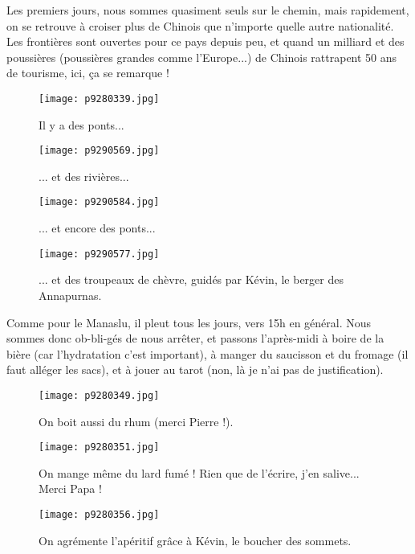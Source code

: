 \documentclass{book}
\begin{document}
Les premiers jours, nous sommes quasiment seuls sur le chemin, mais rapidement, on se retrouve à croiser plus de Chinois que n'importe quelle autre nationalité. Les frontières sont ouvertes pour ce pays depuis peu, et quand un milliard et des poussières (poussières grandes comme l'Europe...) de Chinois rattrapent 50 ans de tourisme, ici, ça se remarque !


\begin{figure}[h]
\centering
\texttt{[image: p9280339.jpg]}
\caption*{Il y a des ponts...}
\end{figure}


\begin{figure}[h]
\centering
\texttt{[image: p9290569.jpg]}
\caption*{... et des rivières...}
\end{figure}


\begin{figure}[h]
\centering
\texttt{[image: p9290584.jpg]}
\caption*{... et encore des ponts...}
\end{figure}


\begin{figure}[h]
\centering
\texttt{[image: p9290577.jpg]}
\caption*{... et des troupeaux de chèvre, guidés par Kévin, le berger des Annapurnas.}
\end{figure}

Comme pour le Manaslu, il pleut tous les jours, vers 15h en général. Nous sommes donc ob-bli-gés de nous arrêter, et passons l'après-midi à boire de la bière (car l'hydratation c'est important), à manger du saucisson et du fromage (il faut alléger les sacs), et à jouer au tarot (non, là je n'ai pas de justification).


\begin{figure}[h]
\centering
\texttt{[image: p9280349.jpg]}
\caption*{On boit aussi du rhum (merci Pierre !).}
\end{figure}


\begin{figure}[h]
\centering
\texttt{[image: p9280351.jpg]}
\caption*{On mange même du lard fumé ! Rien que de l'écrire, j'en salive... Merci Papa !}
\end{figure}


\begin{figure}[h]
\centering
\texttt{[image: p9280356.jpg]}
\caption*{On agrémente l'apéritif grâce à Kévin, le boucher des sommets.}
\end{figure}
\end{document}
